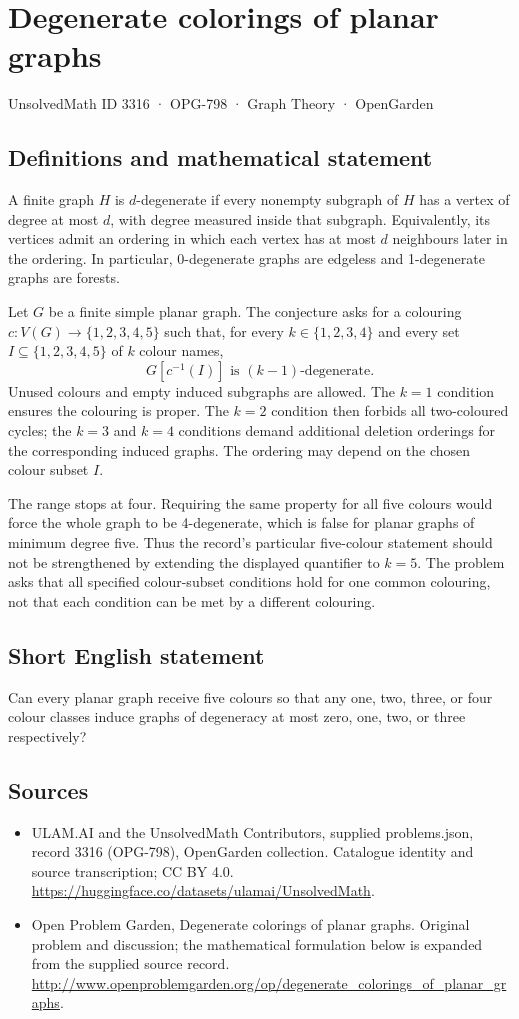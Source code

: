 \documentclass[11pt,a4paper]{article}
\begin{document}
\section*{Degenerate colorings of planar graphs}\label{3316}
{\small UnsolvedMath ID 3316 · OPG-798 · Graph Theory · OpenGarden}
\subsection{Definitions and mathematical statement}
A finite graph $H$ is $d$-degenerate if every nonempty subgraph of $H$
has a vertex of degree at most $d$, with degree measured inside that
subgraph. Equivalently, its vertices admit an ordering in which each
vertex has at most $d$ neighbours later in the ordering. In particular,
0-degenerate graphs are edgeless and 1-degenerate graphs are forests.

Let $G$ be a finite simple planar graph. The conjecture asks for a
colouring $c:V(G)\to\{1,2,3,4,5\}$ such that, for every
$k\in\{1,2,3,4\}$ and every set $I\subseteq\{1,2,3,4,5\}$ of
$k$ colour names,
\[
                         G[c^{-1}(I)]
                       \text{ is }(k-1)\text{-degenerate}.
\]
Unused colours and empty induced subgraphs are allowed. The $k=1$
condition ensures the colouring is proper. The $k=2$ condition then
forbids all two-coloured cycles; the $k=3$ and $k=4$ conditions demand
additional deletion orderings for the corresponding induced graphs.
The ordering may depend on the chosen colour subset $I$.

The range stops at four. Requiring the same property for all five
colours would force the whole graph to be 4-degenerate, which is
false for planar graphs of minimum degree five. Thus the record's
particular five-colour statement should not be strengthened by
extending the displayed quantifier to $k=5$. The problem asks that
all specified colour-subset conditions hold for one common colouring,
not that each condition can be met by a different colouring.
\subsection{Short English statement}
Can every planar graph receive five colours so that any one, two, three, or four colour classes induce graphs of degeneracy at most zero, one, two, or three respectively?
\subsection{Sources}
\begin{itemize}
\item[S1] ULAM.AI and the UnsolvedMath Contributors, supplied problems.json, record 3316 (OPG-798), OpenGarden collection. Catalogue identity and source transcription; CC BY 4.0.
\url{https://huggingface.co/datasets/ulamai/UnsolvedMath}.
\item[S2] Open Problem Garden, Degenerate colorings of planar graphs. Original problem and discussion; the mathematical formulation below is expanded from the supplied source record.
\url{http://www.openproblemgarden.org/op/degenerate_colorings_of_planar_graphs}.
\end{itemize}
\end{document}
